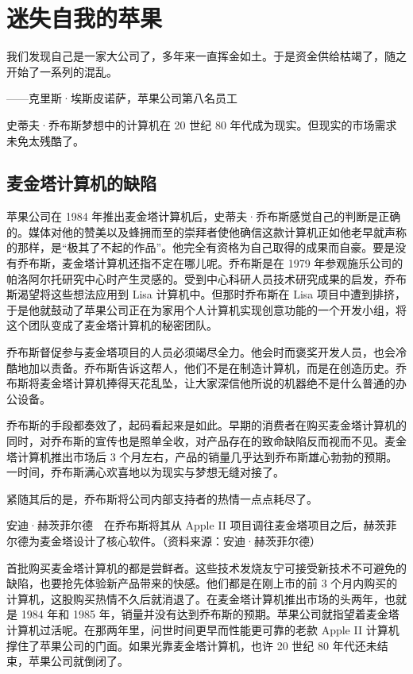 \documentclass[12pt,UTF8]{ctexbook}
\begin{document}
\section{迷失自我的苹果}


我们发现自己是一家大公司了，多年来一直挥金如土。于是资金供给枯竭了，随之开始了一系列的混乱。

——克里斯·埃斯皮诺萨，苹果公司第八名员工



史蒂夫·乔布斯梦想中的计算机在 20 世纪 80 年代成为现实。但现实的市场需求未免太残酷了。





\subsection{麦金塔计算机的缺陷}


苹果公司在 1984 年推出麦金塔计算机后，史蒂夫·乔布斯感觉自己的判断是正确的。媒体对他的赞美以及蜂拥而至的崇拜者使他确信这款计算机正如他老早就声称的那样，是“极其了不起的作品”。他完全有资格为自己取得的成果而自豪。要是没有乔布斯，麦金塔计算机还指不定在哪儿呢。乔布斯是在 1979 年参观施乐公司的帕洛阿尔托研究中心时产生灵感的。受到中心科研人员技术研究成果的启发，乔布斯渴望将这些想法应用到 Lisa 计算机中。但那时乔布斯在 Lisa 项目中遭到排挤，于是他就鼓动了苹果公司正在为家用个人计算机实现创意功能的一个开发小组，将这个团队变成了麦金塔计算机的秘密团队。

乔布斯督促参与麦金塔项目的人员必须竭尽全力。他会时而褒奖开发人员，也会冷酷地加以责备。乔布斯告诉这帮人，他们不是在制造计算机，而是在创造历史。乔布斯将麦金塔计算机捧得天花乱坠，让大家深信他所说的机器绝不是什么普通的办公设备。

乔布斯的手段都奏效了，起码看起来是如此。早期的消费者在购买麦金塔计算机的同时，对乔布斯的宣传也是照单全收，对产品存在的致命缺陷反而视而不见。麦金塔计算机推出市场后 3 个月左右，产品的销量几乎达到乔布斯雄心勃勃的预期。一时间，乔布斯满心欢喜地以为现实与梦想无缝对接了。

紧随其后的是，乔布斯将公司内部支持者的热情一点点耗尽了。



安迪·赫茨菲尔德　在乔布斯将其从 Apple II 项目调往麦金塔项目之后，赫茨菲尔德为麦金塔设计了核心软件。（资料来源：安迪·赫茨菲尔德）

首批购买麦金塔计算机的都是尝鲜者。这些技术发烧友宁可接受新技术不可避免的缺陷，也要抢先体验新产品带来的快感。他们都是在刚上市的前 3 个月内购买的计算机，这股购买热情不久后就消退了。在麦金塔计算机推出市场的头两年，也就是 1984 年和 1985 年，销量并没有达到乔布斯的预期。苹果公司就指望着麦金塔计算机过活呢。在那两年里，问世时间更早而性能更可靠的老款 Apple II 计算机撑住了苹果公司的门面。如果光靠麦金塔计算机，也许 20 世纪 80 年代还未结束，苹果公司就倒闭了。
\end{document}
